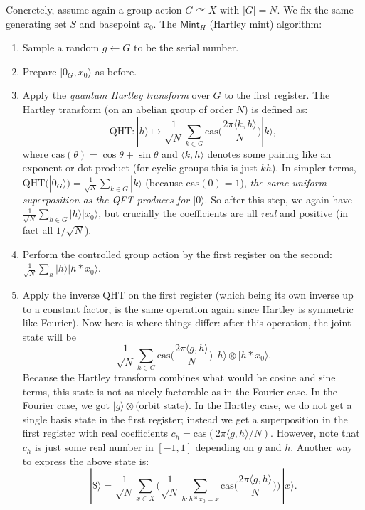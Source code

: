 \documentclass[11pt]{article}
\theoremstyle{definition}
\newcommand{\cas}{\mathrm{cas}}
\begin{document}
Concretely, assume again a group action $G \curvearrowright X$ with $|G|=N$. We fix the same generating set $S$ and basepoint $x_0$. The $\mathsf{Mint}_{H}$ (Hartley mint) algorithm:
\begin{enumerate}
    \item Sample a random $g \leftarrow G$ to be the serial number.
    \item Prepare $|0_G, x_0\rangle$ as before.
    \item Apply the \emph{quantum Hartley transform} over $G$ to the first register. The Hartley transform (on an abelian group of order $N$) is defined as:
    \[
       \mathrm{QHT}: |h\rangle \mapsto \frac{1}{\sqrt{N}} \sum_{k \in G} \cas\!\Big(\frac{2\pi \langle k,h \rangle}{N}\Big) |k\rangle,
    \] 
    where $\mathrm{cas}(\theta) = \cos \theta + \sin \theta$ and $\langle k,h \rangle$ denotes some pairing like an exponent or dot product (for cyclic groups this is just $kh$). In simpler terms, $\mathrm{QHT}(|0_G\rangle) = \frac{1}{\sqrt{N}}\sum_{k \in G} |k\rangle$ (because $\cas(0)=1$), \emph{the same uniform superposition as the QFT produces for $|0\rangle$}. So after this step, we again have $\frac{1}{\sqrt{N}}\sum_{h \in G} |h\rangle|x_0\rangle$, but crucially the coefficients are all \emph{real} and positive (in fact all $1/\sqrt{N}$).
    \item Perform the controlled group action by the first register on the second: $\frac{1}{\sqrt{N}}\sum_{h} |h\rangle |h*x_0\rangle$.
    \item Apply the inverse QHT on the first register (which being its own inverse up to a constant factor, is the same operation again since Hartley is symmetric like Fourier). Now here is where things differ: after this operation, the joint state will be 
    \[
       \frac{1}{\sqrt{N}} \sum_{h \in G} \cas\!\Big(\frac{2\pi \langle g,h \rangle}{N}\Big)\, |h\rangle \otimes |h*x_0\rangle.
    \] 
    Because the Hartley transform combines what would be cosine and sine terms, this state is not as nicely factorable as in the Fourier case. In the Fourier case, we got $|g\rangle \otimes \text{(orbit state)}$. In the Hartley case, we do not get a single basis state in the first register; instead we get a superposition in the first register with real coefficients $c_h = \cas(2\pi\langle g,h\rangle/N)$. However, note that $c_h$ is just some real number in $[-1,1]$ depending on $g$ and $h$. Another way to express the above state is:
    \[
      |\$\rangle = \frac{1}{\sqrt{N}} \sum_{x \in X} \Big(\frac{1}{\sqrt{N}}\sum_{h: h*x_0 = x} \cas\!\big(\frac{2\pi \langle g,h \rangle}{N}\big)\Big)\, |x\rangle.
\]
\end{enumerate}
\end{document}

